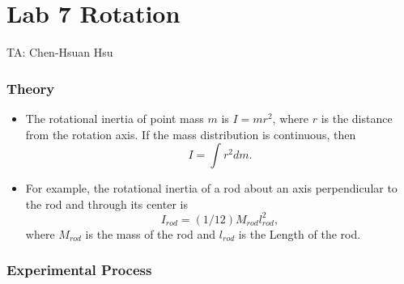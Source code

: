 \documentclass{article}
\begin{document}
\part*{Lab 7 Rotation}
TA: Chen-Hsuan Hsu\\
\vspace{-0.3in}
\section*{Theory}
\begin{itemize}

\item The rotational inertia of point mass $m$ is $I= m r^2$, where $r$ is the distance from the rotation axis. If the mass distribution is continuous, then \[I= \int r^2 dm.\]

\item For example, the rotational inertia of a rod about an axis perpendicular to the rod and through its center is \[I_{rod}=(1/12)M_{rod}l_{rod}^2,\] where $M_{rod}$ is the mass of the rod and $l_{rod}$ is the Length of the rod.

\end{itemize}

\section*{Experimental Process}
\end{document}
